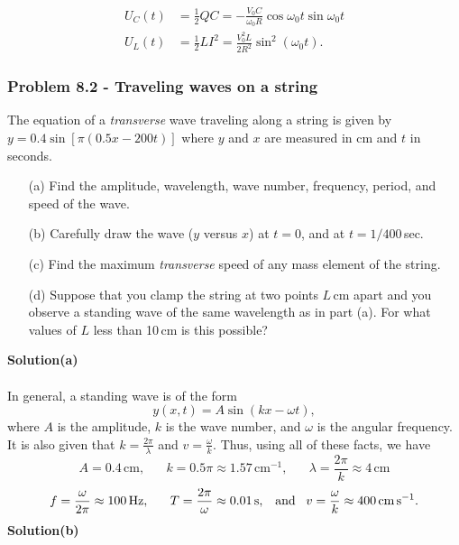 \documentclass{article}
\begin{document}
\begin{equation}
    \begin{aligned}
        U_C(t) &= \frac{1}{2}QC =-\frac{V_0C}{\omega_0R}\cos\omega_0t\sin\omega_0t\\
        U_L(t) &= \frac{1}{2} L I^2 = \frac{V_0^2 L}{2 R^2} \sin^2(\omega_0 t).
    \end{aligned}
\end{equation}

\subsubsection*{Problem 8.2 - Traveling waves on a string}
The equation of a \textit{transverse} wave traveling along a string is given by $y=0.4\sin[\pi(0.5x-200t)]$ where $y$ and $x$ are measured in cm and $t$ in seconds.
\begin{enumerate}
    \item[(a)]Find the amplitude, wavelength, wave number, frequency, period, and speed of the wave.
    \item[(b)]Carefully draw the wave ($y$ versus $x$) at $t=0$, and at $t=1/400\,$sec.
    \item[(c)]Find the maximum \textit{transverse} speed of any mass element of the string.
    \item[(d)]Suppose that you clamp the string at two points $L\,$cm apart and you observe a standing wave of the same wavelength as in part (a). For what values of $L$ less than 10\,cm is this possible?
\end{enumerate}
\textbf{Solution(a)}
\\
\\In general, a standing wave is of the form
\begin{equation}
    y(x,t)=A\sin(kx-\omega t),
\end{equation}
where $A$ is the amplitude, $k$ is the wave number,  and $\omega$ is the angular frequency. It is also given that $k=\frac{2\pi}{\lambda}$ and $v=\frac{\omega}{k}$. Thus, using all of these facts, we have
\[A=0.4\,\text{cm},\,\,\,\,\,\,\,\,\,\,k=0.5\pi\approx1.57\,\text{cm}^{-1},\,\,\,\,\,\,\,\,\,\,\lambda=\frac{2\pi}{k}\approx4\,\text{cm}\]
\[f=\frac{\omega}{2\pi}\approx100\,\text{Hz},\,\,\,\,\,\,\,\,\,\,T=\frac{2\pi}{\omega}\approx0.01\,\text{s},\,\,\,\,\,\text{and}\,\,\,\,\,v=\frac{\omega}{k}\approx400\,\text{cm\,s}^{-1}.\]
\textbf{Solution(b)}
\end{document}
